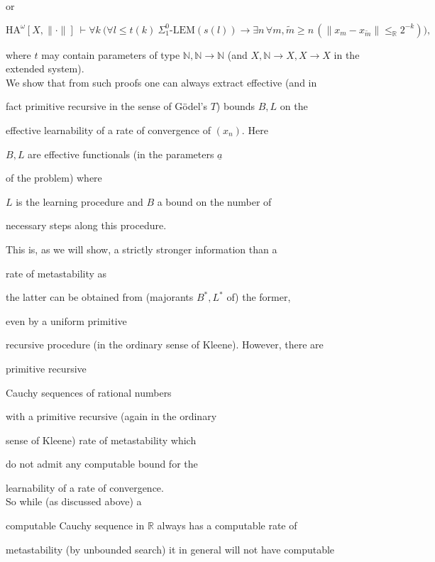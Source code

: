 \documentclass[1p]{elsarticle}
\newcommand{\RR}{\ensuremath{\mathbb{R}}}
\newcommand{\NN}{\ensuremath{\mathbb{N}}}
\theoremstyle{plain}
\theoremstyle{definition}
\theoremstyle{remark}
\theoremstyle{definition}
\begin{document}
or 

\[ \mbox{HA}^{\omega}[X,\|\cdot\|] \ \vdash \forall k \  \big( \forall l\le 

t(k) \ 

\Sigma^0_1\mbox{-LEM}(s(l))\to \exists n\,\forall m,\tilde{m}\ge n\,

(\|x_m-x_{\tilde{m}}\|\le_{\RR} 2^{-k})\big), \]

where $t$ may contain parameters of type $\NN, \NN\to\NN$ (and $X,\NN\to X, 

X\to X$ in the extended system). \\[2mm] 

We show that from such proofs one can always extract effective (and in 

fact primitive recursive in the sense of G\"odel's $T$) bounds $B,L$ on the 

effective learnability of a rate of convergence of $(x_n).$ Here 

$B,L$ are effective functionals (in the parameters $\underline{a}$ 

of the problem) where 

$L$ is the learning procedure and $B$ a bound on the number of 

necessary steps along this procedure.  

This is, as we will show, a strictly stronger information than a 

rate of metastability as 

the latter can be obtained from (majorants $B^*,L^*$ of) the former, 

even by a uniform primitive 

recursive procedure (in the ordinary sense of Kleene). However, there are 

primitive recursive 

Cauchy sequences of rational numbers 

with a primitive recursive (again in the ordinary 

sense of Kleene) rate of metastability which 

do not admit any computable bound for the 

learnability of a rate of convergence. \\ So while (as discussed above) a 

computable Cauchy sequence in $\RR$ always has a computable rate of 

metastability (by unbounded search) it in general will not have computable 
\end{document}
